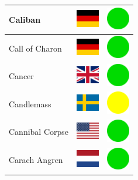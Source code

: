 \documentclass[12pt, a4paper, twoside]{report}
\begin{document}
\begin{center}
\begin{longtable}{|p{5cm}|p{2cm}|p{2cm}|}
Caliban & \includegraphics[width=1cm]{4x3/de} & \includegraphics[width=1cm]{likes/y} \\ \hline
Call of Charon & \includegraphics[width=1cm]{4x3/de} & \includegraphics[width=1cm]{likes/y} \\ \hline
Cancer & \includegraphics[width=1cm]{4x3/gb} & \includegraphics[width=1cm]{likes/y} \\ \hline
Candlemass & \includegraphics[width=1cm]{4x3/se} & \includegraphics[width=1cm]{likes/m} \\ \hline
Cannibal Corpse & \includegraphics[width=1cm]{4x3/us} & \includegraphics[width=1cm]{likes/y} \\ \hline
Carach Angren & \includegraphics[width=1cm]{4x3/nl} & \includegraphics[width=1cm]{likes/y} \\ \hline

\end{longtable}
\end{center}
\end{document}
